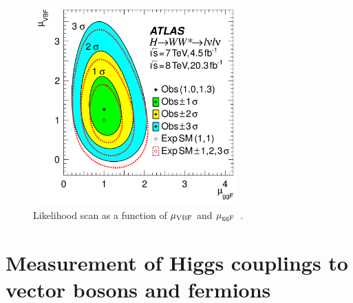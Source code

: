 \begin{figure}[h!]
  \centering
  \captionsetup{justification=centering}

  \includegraphics[width=0.7\textwidth]{figures/WW_muind}
  \caption{Likelihood scan as a function of $\mu_{{\rm VBF}}$ and $\mu_{{\rm ggF}}$~\cite{WW2015}.}
  \label{fig:mu_2d}
\end{figure}

\section{Measurement of Higgs couplings to vector bosons and fermions}


